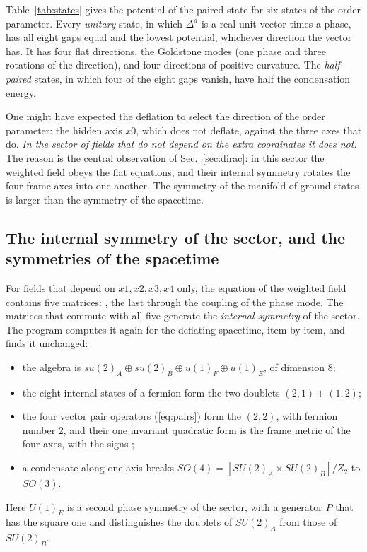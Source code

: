 Table~\ref{tab:states} gives the potential of the paired state for six states of the order
parameter. Every \emph{unitary} state, in which $\Delta^{a}$ is a real unit vector times a phase, has
all eight gaps equal and the lowest potential, whichever direction the vector has. It has four flat
directions, the Goldstone modes (one phase and three rotations of the direction), and four
directions of positive curvature. The \emph{half-paired} states, in which four of the eight gaps
vanish, have half the condensation energy.

One might have expected the deflation to select the direction of the order parameter: the hidden
axis $x0$, which does not deflate, against the three axes that do. \emph{In the sector of fields
that do not depend on the extra coordinates it does not.} The reason is the central observation of
Sec.~\ref{sec:dirac}: in this sector the weighted field obeys the flat equations, and their internal
symmetry rotates the four frame axes into one another. The symmetry of the manifold of ground states
is larger than the symmetry of the spacetime.

\subsection{The internal symmetry of the sector, and the symmetries of the spacetime}
\label{sec:hidden}

For fields that depend on $x1,x2,x3,x4$ only, the equation of the weighted field contains five
matrices: , the last through the coupling of the phase mode. The matrices that commute
with all five generate the \emph{internal symmetry} of the sector. The program computes it again for
the deflating spacetime, item by item, and finds it unchanged:
\begin{itemize}
\item the algebra is $su(2)_A\oplus su(2)_B\oplus u(1)_F\oplus u(1)_E$, of dimension 8;
\item the eight internal states of a fermion form the two doublets $(2,1)+(1,2)$;
\item the four vector pair operators (\ref{eq:pairs}) form the $(2,2)$, with fermion number 2, and
their one invariant quadratic form is the frame metric of the four axes, with the signs
;
\item a condensate along one axis breaks $SO(4)=[SU(2)_A\times SU(2)_B]/Z_2$ to $SO(3)$.
\end{itemize}
Here $U(1)_E$ is a second phase symmetry of the sector, with a generator $P$ that has the square one
and distinguishes the doublets of $SU(2)_A$ from those of $SU(2)_B$.

